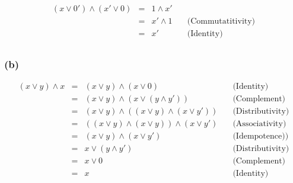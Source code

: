 \documentclass{article} %
\begin{document}
\\
\[\begin{array}{rllr}
    (x \vee 0') \wedge (x' \vee 0) &=& 1 \wedge x' \\
                                            &=& x'\wedge 1   &\quad\mbox{(Commutatitivity)}\\
                                            &=& x'              &\quad\mbox{(Identity)}\\
\end{array}\]

\subsubsection*{(b)}
\[\begin{array}{rllr}
    (x \vee y) \wedge x   &=& (x \vee y) \wedge (x \vee 0)       &\quad\mbox{(Identity)}\\
                                &=& (x \vee y) \wedge (x \vee (y \wedge y'))    &\quad\mbox{(Complement)}\\
                                &=& (x \vee y) \wedge ((x \vee y) \wedge (x \vee y'))    &\quad\mbox{(Distributivity)}\\
                                &=& ((x \vee y) \wedge (x \vee y)) \wedge (x \vee y')    &\quad\mbox{(Associativity)}\\
                                &=& (x \vee y) \wedge (x \vee y') &\quad\mbox{(Idempotence))}\\
                                &=& x \vee (y \wedge y')      &\quad\mbox{(Distributivity)}\\
                                &=& x \vee 0     &\quad\mbox{(Complement)}\\
                                &=& x   &\quad\mbox{(Identity)}\\
\end{array}\]
\end{document}
